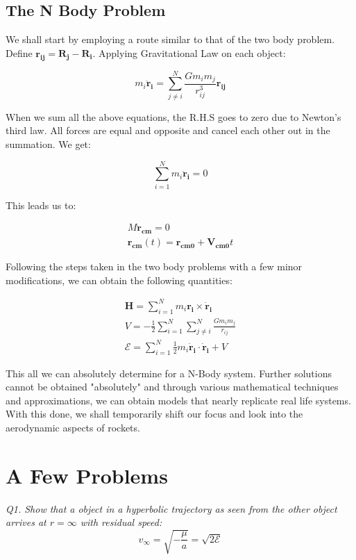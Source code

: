 \documentclass[12pt, letterpaper]{article}
\begin{document}
\subsection{The N Body Problem}

We shall start by employing a route similar to that of the two body problem. Define $ \mathbf{r_{ij}} = \mathbf{R_{j}} - \mathbf{R_{i}}$. Applying Gravitational Law on each object:

\begin{displaymath}
m_i\mathbf{\ddot{r}_i} = \sum_{j \neq i}^{N} \frac{Gm_im_j}{r_{ij}^3}\mathbf{r_{ij}}
\end{displaymath}

When we sum all the above equations, the R.H.S goes to zero due to Newton's third law. All forces are equal and opposite and cancel each other out in the summation. We get:

\begin{displaymath}
\sum_{i=1}^{N} m_i\mathbf{\ddot{r}_i} = 0
\end{displaymath}

This leads us to:

\begin{gather*}
M\mathbf{\ddot{r}_{cm}} = 0\\
\mathbf{r_{cm}}(t) = \mathbf{r_{cm0}} + \mathbf{V_{cm0}}t
\end{gather*}

Following the steps taken in the two body problems with a few minor modifications, we can obtain the following quantities:

\begin{gather*}
\mathbf{H} = \sum_{i=1}^{N} m_i\mathbf{r_i}\times\mathbf{\dot{r}_i}\\
V = -\frac{1}{2}\sum_{i=1}^{N}\sum_{j \neq i}^{N}\frac{Gm_im_j}{r_{ij}}\\
\mathcal{E} = \sum_{i=1}^{N}\frac{1}{2}m_i\mathbf{\dot{r}_i}\cdot\mathbf{\dot{r}_i} + V
\end{gather*}

This all we can absolutely determine for a N-Body system. Further solutions cannot be obtained "absolutely" and through various mathematical techniques and approximations, we can obtain models that nearly replicate real life systems. With this done, we shall temporarily shift our focus and look into the aerodynamic aspects of rockets.

\newpage

\section{A Few Problems}
\textit{Q1. Show that a object in a hyperbolic trajectory as seen from the other object arrives at $r = \infty $ with residual speed:}
\[
	v_\infty = \sqrt{-\frac{\mu}{a}} = \sqrt{2\mathcal{E}}
\]
\end{document}
